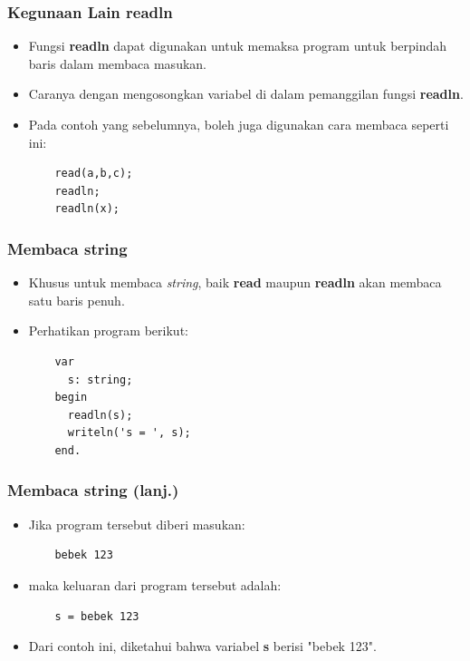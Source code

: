 \begin{frame}[fragile]
\frametitle{Kegunaan Lain readln}
\begin{itemize}
  \item Fungsi \textbf{readln} dapat digunakan untuk memaksa program untuk berpindah baris dalam membaca masukan. 
  \item Caranya dengan mengosongkan variabel di dalam pemanggilan fungsi \textbf{readln}.
  \item Pada contoh yang sebelumnya, boleh juga digunakan cara membaca seperti ini:
  \begin{lstlisting}
    read(a,b,c);
    readln;
    readln(x);
  \end{lstlisting}
\end{itemize}
\end{frame}

\begin{frame}[fragile]
\frametitle{Membaca string}
\begin{itemize}
  \item Khusus untuk membaca \textit{string}, baik \textbf{read} maupun \textbf{readln} akan membaca satu baris penuh.
  \item Perhatikan program berikut:
  \begin{lstlisting}
    var
      s: string;
    begin
      readln(s);
      writeln('s = ', s);
    end.
  \end{lstlisting}
\end{itemize}
\end{frame}

\begin{frame}[fragile]
\frametitle{Membaca string (lanj.)}
\begin{itemize}
  \item Jika program tersebut diberi masukan:
  \begin{lstlisting}
    bebek 123
  \end{lstlisting}
  \item maka keluaran dari program tersebut adalah:
  \begin{lstlisting}
    s = bebek 123
  \end{lstlisting}
  \item Dari contoh ini, diketahui bahwa variabel \textbf{s} berisi "bebek 123".
\end{itemize}
\end{frame}

